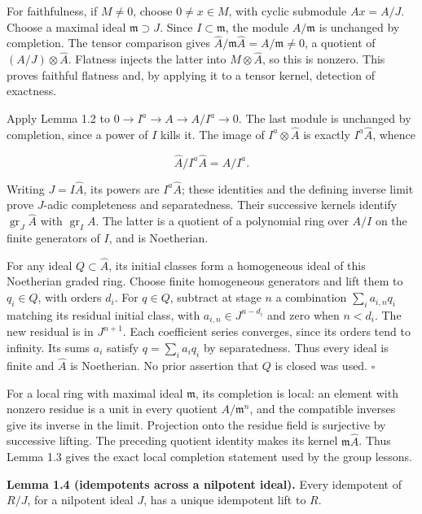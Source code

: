 \documentclass[11pt,a4paper,openany]{report}
\begin{document}
For faithfulness, if \(M\ne0\), choose \(0\ne x\in M\), with cyclic submodule \(Ax=A/J\). Choose a maximal ideal \(\mathfrak m\supset J\). Since \(I\subset\mathfrak m\), the module \(A/\mathfrak m\) is unchanged by completion. The tensor comparison gives \(\widehat A/\mathfrak m\widehat A=A/\mathfrak m\ne0\), a quotient of \((A/J)\otimes\widehat A\). Flatness injects the latter into \(M\otimes\widehat A\), so this is nonzero. This proves faithful flatness and, by applying it to a tensor kernel, detection of exactness.

Apply Lemma 1.2 to \(0\to I^a\to A\to A/I^a\to0\). The last module is unchanged by completion, since a power of \(I\) kills it. The image of \(I^a\otimes\widehat A\) is exactly \(I^a\widehat A\), whence

\[
\widehat A/I^a\widehat A=A/I^a.
\]

Writing \(J=I\widehat A\), its powers are \(I^a\widehat A\); these identities and the defining inverse limit prove \(J\)-adic completeness and separatedness. Their successive kernels identify \(\operatorname{gr}_J\widehat A\) with \(\operatorname{gr}_IA\). The latter is a quotient of a polynomial ring over \(A/I\) on the finite generators of \(I\), and is Noetherian.

For any ideal \(Q\subset\widehat A\), its initial classes form a homogeneous ideal of this Noetherian graded ring. Choose finite homogeneous generators and lift them to \(q_i\in Q\), with orders \(d_i\). For \(q\in Q\), subtract at stage \(n\) a combination \(\sum_i a_{i,n}q_i\) matching its residual initial class, with \(a_{i,n}\in J^{n-d_i}\) and zero when \(n<d_i\). The new residual is in \(J^{n+1}\). Each coefficient series converges, since its orders tend to infinity. Its sums \(a_i\) satisfy \(q=\sum_i a_iq_i\) by separatedness. Thus every ideal is finite and \(\widehat A\) is Noetherian. No prior assertion that \(Q\) is closed was used. \(\square\)

For a local ring with maximal ideal \(\mathfrak m\), its completion is local: an element with nonzero residue is a unit in every quotient \(A/\mathfrak m^n\), and the compatible inverses give its inverse in the limit. Projection onto the residue field is surjective by successive lifting. The preceding quotient identity makes its kernel \(\mathfrak m\widehat A\). Thus Lemma 1.3 gives the exact local completion statement used by the group lessons.

\textbf{Lemma 1.4 (idempotents across a nilpotent ideal).} Every idempotent of \(R/J\), for a nilpotent ideal \(J\), has a unique idempotent lift to \(R\).
\end{document}

